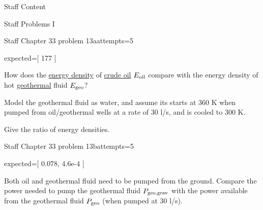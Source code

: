 \begin{edXchapter}{Staff Content}
\begin{edXsection}{Staff Problems I}
\begin{edXvertical}
\begin{edXproblem}{Staff Chapter 33 problem 13a}{attempts=5}
\begin{edXscript}
expected=[ 177 ]
\end{edXscript}


How does the \href{http://en.wikipedia.org/wiki/Energy_density}{energy
  density} of \href{http://en.wikipedia.org/wiki/Petroleum}{crude oil}
$E_{\rm oil}$ compare with the energy density of hot
\href{http://en.wikipedia.org/wiki/Geothermal_energy}{geothermal}
fluid $E_{\rm geo}$?

Model the geothermal fluid as water, and assume its starts at 360 K
when pumped from oil/geothermal wells at a rate of 30 l/s, and is
cooled to 300 K.

Give the ratio of energy densities.

  
 

\end{edXproblem}

\begin{edXproblem}{Staff Chapter 33 problem 13b}{attempts=5}

\begin{edXscript}
expected=[ 0.078, 4.6e-4 ]
\end{edXscript}


Both oil and geothermal fluid need to be pumped from the ground.
Compare the power needed to pump the geothermal fluid $P_{\rm geo, grav}$ with the power
available from the geothermal fluid $P_{\rm geo}$ (when pumped at 30
l/s).


\end{edXproblem}
\end{edXvertical}
\end{edXsection}
\end{edXchapter}
